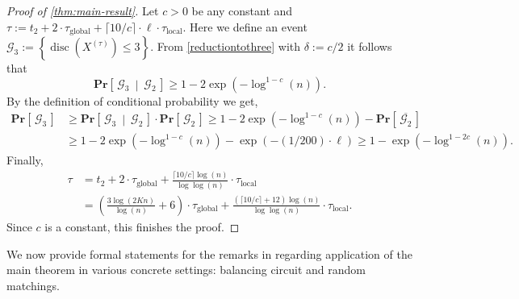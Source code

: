 \documentclass[twoside,leqno]{article}
\newcommand{\Pro}[1]{\mathbf{Pr} \left[\,#1\,\right]}
\newcommand{\Proco}[2]{\mathbf{Pr} \left[\,#1~\middle\vert~#2\,\right]}
\DeclareMathOperator{\discr}{\mathrm{disc}}
\DeclareMathOperator{\1}{\mathbf{1}}
\newcommand{\taulocal}{\tau_{\mathrm{local}}}
\newcommand{\tauglobal}{\tau_{\mathrm{global}}}
\numberwithin{equation}{section}
\begin{document}
\begin{proof}[Proof of \cref{thm:main-result}]
Let $c>0$ be any constant and $\tau:= t_2+ 2\cdot \tauglobal + \lceil 10/c \rceil \cdot \ell \cdot \taulocal$. Here we define an event $\mathcal{G}_3:=\left\{\discr(X^{(\tau)})\le 3\right\}$.
From \cref{reductiontothree} with $\delta:=c/2$ it follows that \[\Proco{\mathcal{G}_3}{\mathcal{G}_2}\ge 1-2\exp(-\log^{1-c}(n)).\] By the definition of conditional probability we get,
\begin{align*}
    \Pro{\mathcal{G}_3} & \ge \Proco{\mathcal{G}_3}{\mathcal{G}_2}\cdot \Pro{\mathcal{G}_2} \ge 1 -2\exp(-\log^{1-c}(n)) - \Pro{\overline{\mathcal{G}_2}}
    \\&\ge 1- 2\exp(-\log^{1-c}(n)) - \exp(-(1/200)\cdot \ell) \ge 1-\exp(-\log^{1-2c}(n)) .
\end{align*}
Finally, 
\begin{align*}
    \tau &= t_2 + 2\cdot \tauglobal + \frac{\lceil 10/c\rceil \log (n)}{\log\log(n)}\cdot \taulocal \\
    &= \left(\frac{3\log(2Kn)}{\log(n)}+6\right)\cdot\tauglobal + \frac{(\lceil 10/c\rceil+12)\log(n)}{\log\log(n)} \cdot \taulocal.
\end{align*}
Since $c$ is a constant, this finishes the proof.
\end{proof}




We now provide formal statements for the remarks in  regarding application of the main theorem in various concrete settings: balancing circuit and random matchings.
\end{document}
